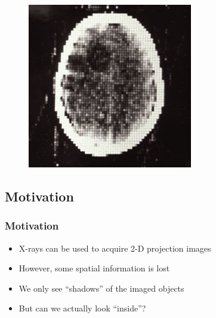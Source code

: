 \begin{frame}
\begin{figure}[tb]
\begin{minipage}{.45\linewidth}
			\includegraphics[width=0.85\linewidth]{images/first_clinical_ct_cut}
			\label{fig:ct_hist_1}
		\end{minipage}
	\end{figure}

\end{frame}

\subsection{Motivation}
\label{sub:ct_moti}

\begin{frame}
	\frametitle{Motivation}

	\begin{itemize}
		\item X-rays can be used to acquire 2-D projection images
		\item However, some spatial information is lost
		\item We only see ``shadows'' of the imaged objects
		\item But can we actually look ``inside''?
	\end{itemize}

\end{frame}


